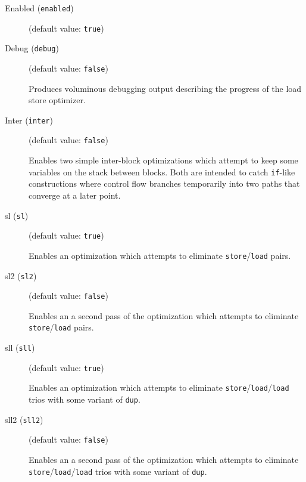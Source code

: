 \documentclass{article}
\begin{document}
\begin{description}

\item[Enabled ({\tt enabled})]
(default value: {\tt true})






\item[Debug ({\tt debug})]
(default value: {\tt false})




Produces voluminous debugging output describing the progress of
the load store optimizer.



\item[Inter ({\tt inter})]
(default value: {\tt false})




Enables two simple inter-block optimizations which attempt to
keep some variables on the stack between blocks.  Both are
intended to catch {\tt if}-like constructions where control
flow branches temporarily into two paths that converge at a later
point.



\item[sl ({\tt sl})]
(default value: {\tt true})




Enables an optimization which attempts to eliminate
{\tt store}/{\tt load} pairs.



\item[sl2 ({\tt sl2})]
(default value: {\tt false})




Enables an a second pass of the optimization which attempts to
eliminate {\tt store}/{\tt load} pairs.



\item[sll ({\tt sll})]
(default value: {\tt true})




Enables an optimization which attempts to eliminate 
{\tt store}/{\tt load}/{\tt load}
trios with some variant of {\tt dup}.



\item[sll2 ({\tt sll2})]
(default value: {\tt false})




Enables an a second pass of the optimization which attempts to
eliminate {\tt store}/{\tt load}/{\tt load} trios with
some variant of {\tt dup}.



\end{description}
\end{document}
